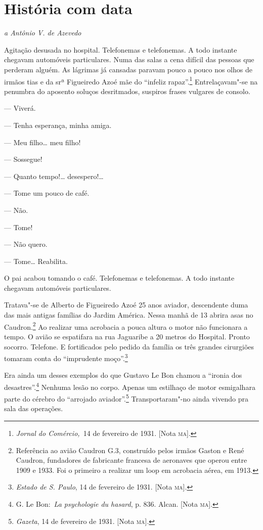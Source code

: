 \chapter{História com data}

\hfill{}\emph{a Antônio V. de Azevedo}\bigskip

\noindent{}Agitação desusada no hospital. Telefonemas e telefonemas. A todo
instante chegavam automóveis particulares. Numa das salas a cena difícil
das pessoas que perderam alguém. As lágrimas já cansadas paravam pouco a
pouco nos olhos de irmãos tias e da srª Figueiredo Azoé mãe do ``infeliz
rapaz''.\footnote{\emph{Jornal do Comércio,~}14 de fevereiro de 1931.
  {[}Nota \textsc{ma}{]}.} Entrelaçavam"-se na penumbra do aposento soluços
desritmados, suspiros frases vulgares de consolo.

--- Viverá.

--- Tenha esperança, minha amiga.

--- Meu filho\ldots{} meu filho!

--- Sossegue!

--- Quanto tempo!\ldots{} desespero!\ldots{}

--- Tome um pouco de café.

--- Não.

--- Tome!

--- Não quero.

--- Tome\ldots{} Reabilita.

O pai acabou tomando o café. Telefonemas e telefonemas. A todo instante
chegavam automóveis particulares.

Tratava"-se de Alberto de Figueiredo Azoé 25 anos aviador, descendente
duma das mais antigas famílias do Jardim América. Nessa manhã de 13
abrira asas no Caudron.\footnote{Referência ao avião Caudron G.3,
  construído pelos irmãos Gaston e René Caudron, fundadores de
  fabricante francesa de aeronaves que operou entre 1909 e 1933. Foi o
  primeiro a realizar um loop em acrobacia aérea, em 1913.} Ao realizar
uma acrobacia a pouca altura o motor não funcionara a tempo. O avião se
espatifara na rua Jaguaribe a 20 metros do Hospital. Pronto socorro.
Telefone. E fortificados pelo pedido da família os três grandes
cirurgiões tomaram conta do ``imprudente moço''.\footnote{\emph{Estado de
  S. Paulo}, 14 de fevereiro de 1931. {[}Nota \textsc{ma}{]}.}

Era ainda um desses exemplos do que Gustavo Le Bon chamou a ``ironia dos
desastres''.\footnote{G. Le Bon:~\emph{La psychologie du hasard}, p. 836.
  Alcan. {[}Nota \textsc{ma}{]}.} Nenhuma lesão no corpo. Apenas um estilhaço de
motor esmigalhara parte do cérebro do ``arrojado aviador''.\footnote{\emph{Gazeta},
  14 de fevereiro de 1931. {[}Nota \textsc{ma}{]}.} Transportaram"-no ainda
vivendo pra sala das operações.

